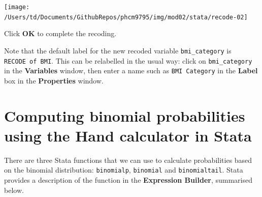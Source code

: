 \documentclass[
]{memoir}
\begin{document}
\texttt{[image: /Users/td/Documents/GithubRepos/phcm9795/img/mod02/stata/recode-02]}

Click \textbf{OK} to complete the recoding.

Note that the default label for the new recoded variable \texttt{bmi\_category} is \texttt{RECODE\ of\ BMI}. This can be relabelled in the usual way: click on \texttt{bmi\_category} in the \textbf{Variables} window, then enter a name such as \texttt{BMI\ Category} in the \textbf{Label} box in the \textbf{Properties} window.

\hypertarget{computing-binomial-probabilities-using-the-hand-calculator-in-stata}{%
\section{Computing binomial probabilities using the Hand calculator in Stata}\label{computing-binomial-probabilities-using-the-hand-calculator-in-stata}}

There are three Stata functions that we can use to calculate probabilities based on the binomial distribution: \texttt{binomialp}, \texttt{binomial} and \texttt{binomialtail}. Stata provides a description of the function in the \textbf{Expression Builder}, summarised below.

 
  \providecommand{\huxb}[2]{\arrayrulecolor[RGB]{#1}\global\arrayrulewidth=#2pt}
  \providecommand{\huxvb}[2]{\color[RGB]{#1}\vrule width #2pt}
  \providecommand{\huxtpad}[1]{\rule{0pt}{#1}}
  \providecommand{\huxbpad}[1]{\rule[-#1]{0pt}{#1}}
\end{document}
